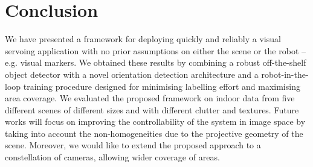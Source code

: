 \documentclass[conference]{ieeeconf}
\begin{document}
% 



\section{Conclusion}%
\label{sec:conclusion}
We have presented a framework for deploying quickly and reliably a visual servoing application with no prior assumptions on either the scene or the robot -- e.g. visual markers.
We obtained these results by combining a robust off-the-shelf object detector with a novel orientation detection architecture and a robot-in-the-loop training procedure designed for minimising labelling effort and maximising area coverage.
We evaluated the proposed framework on indoor data from five different scenes of different sizes and with different clutter and textures.
Future works will focus on improving the controllability of the system in image space by taking into account the non-homogeneities due to the projective geometry of the scene.
Moreover, we would like to extend the proposed approach to a constellation of cameras, allowing wider coverage of areas.



\end{document}
